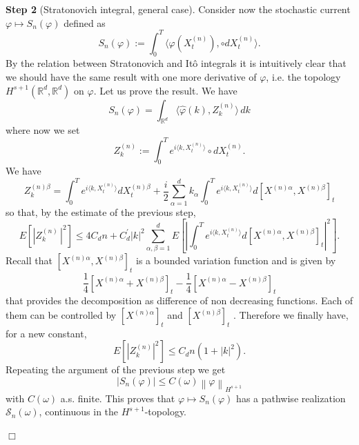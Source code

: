 \documentclass{article}
\newenvironment{proof}[1][Proof]{{\sc #1.} }{\hfill $\Box$}
\begin{document}
\begin{proof}
\textbf{Step 2} (Stratonovich integral, general case). Consider now the
stochastic current $\varphi \mapsto S_{n}\left( \varphi \right) $ defined as 
\begin{equation*}
S_{n}\left( \varphi \right) :=\int_{0}^{T}\langle \varphi (
X_{t}^{( n) }) ,\circ dX_{t}^{( n)
}\rangle .
\end{equation*}
By the relation between Stratonovich and It\^{o} integrals it is intuitively
clear that we should have the same result with one more derivative of $%
\varphi $, i.e. the topology $H^{s+1}\left( \mathbb{R}^{d},\mathbb{R}%
^{d}\right) $ on $\varphi $. Let us prove the result. We have 
\begin{equation*}
S_{n}\left( \varphi \right) =\int_{\mathbb{R}^{d}}\langle \hat{\varphi}%
\left( k\right) ,Z_{k}^{\left( n\right) }\rangle \,dk
\end{equation*}
where now we set 
\begin{equation*}
Z_{k}^{\left( n\right) }:=\int_{0}^{T}e^{i\langle k,X_{t}^{(
n) }\rangle }\circ dX_{t}^{( n) }.
\end{equation*}
We have 
\begin{equation*}
Z_{k}^{\left( n\right) \beta }=\int_{0}^{T}e^{i\langle k,X_{t}^{(
n) }\rangle }dX_{t}^{( n) \beta }+\frac{i}{2}%
\sum_{\alpha =1}^{d}k_{\alpha }\int_{0}^{T}e^{i\langle k,X_{t}^{(
n) }\rangle }d[ X^{( n) \alpha },X^{(
n) \beta }] _{t}
\end{equation*}
so that, by the estimate of the previous step, 
\begin{equation*}
E\left[ \left| Z_{k}^{\left( n\right) }\,\right| ^{2}\right] \leq
4C_{d}n+C_{d}^{\prime }\left| k\right| ^{2}\sum_{\alpha ,\beta =1}^{d}E\left[
\left| \int_{0}^{T}e^{i\langle k,X_{t}^{( n) }\rangle
}d[ X^{( n) \alpha },X^{( n) \beta }]
_{t}\right| ^{2}\right] .
\end{equation*}
Recall that $[ X^{\left( n\right) \alpha },X^{\left( n\right) \beta }%
] _{t}$ is a bounded variation function and is given by 
\begin{equation*}
\frac{1}{4}[ X^{\left( n\right) \alpha }+X^{\left( n\right) \beta }%
] _{t}-\frac{1}{4}[ X^{\left( n\right) \alpha }-X^{\left(
n\right) \beta }] _{t}
\end{equation*}
that provides the decomposition as difference of non decreasing functions.
Each of them can be controlled by $[ X^{\left( n\right) \alpha }]
_{t}$ and $[ X^{\left( n\right) \beta }] _{t}$ . Therefore we
finally have, for a new constant, 
\begin{equation}
\label{eq:strat_est1}
E\left[ | Z_{k}^{\left( n\right) }| ^{2}\right] \leq
C_{d}n ( 1+\left| k\right| ^{2}) .
\end{equation}
Repeating the argument of the previous step we get 
\begin{equation*}
\left| S_{n}\left( \varphi \right) \right| \leq C\left( \omega \right)
\left\| \varphi \right\| _{H^{s+1}}
\end{equation*}
with $C\left( \omega \right) $ a.s. finite. This proves that $\varphi
\mapsto S_{n}\left( \varphi \right) $ has a pathwise realization $\mathcal{S}%
_{n}\left( \omega \right) $, continuous in the $H^{s+1}$-topology.


\end{proof}
\end{document}
